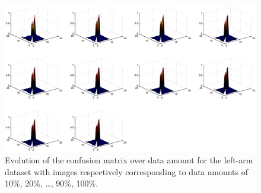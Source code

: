 \documentclass{sig-alternate}
\begin{document}
\begin{figure}
\begin{center}
  \includegraphics[width=1.0\linewidth]{matlab_output/evol_left_perc.eps}
\end{center}
  \caption{Evolution of the confusion matrix over data amount for the left-arm dataset with images respectively corresponding to data amounts of 10\%, 20\%, \ldots, 90\%, 100\%.}
  \label{fig:evo_conf_left}
\end{figure}

%


\end{document}
